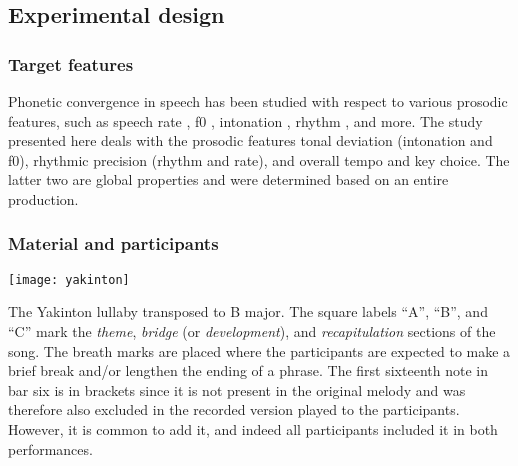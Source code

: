 
\subsection{Experimental design}
\label{subsec:design_music}

\subsubsection{Target features}
\label{subsubsec:target_features_music}

Phonetic convergence in speech has been studied with respect to various prosodic features, such as speech rate \citep{Schweitzer2013convergence, Pardo2012phonetic}, \ac{f0} \citep{Babel2012role, Collins1998convergence}, intonation \citep{DImperio2014phonetic, Simonet2011intonational}, rhythm \citep{Krivokapic2013rhythm}, and more.
The study presented here deals with the prosodic features tonal deviation (intonation and \ac{f0}), rhythmic precision (rhythm and rate), and overall tempo and key choice.
The latter two are global properties and were determined based on an entire production.


\subsubsection{Material and participants}
\label{subsubsec:material_participants_music}

\begin{snippet}[t]
	\centering
	\texttt{[image: yakinton]}
	\caption{The Yakinton lullaby transposed to B major.
		The square labels \enquote{A}, \enquote{B}, and \enquote{C} mark the \emph{theme}, \emph{bridge} (or \emph{development}), and \emph{recapitulation} sections of the song.
		The breath marks are placed where the participants are expected to make a brief break and/or lengthen the ending of a phrase.
		The first sixteenth note in bar six is in brackets since it is not present in the original melody and was therefore also excluded in the recorded version played to the participants.
		However, it is common to add it, and indeed all participants included it in both performances.}
	\label{snippet:yakinton}
\end{snippet}

